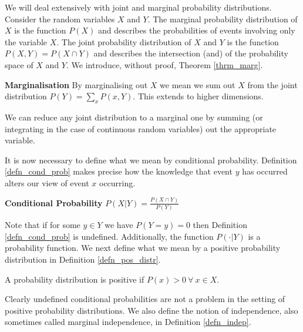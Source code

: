 \documentclass[../masters.tex]{subfiles}
\begin{document}
We will deal extensively with joint and marginal probability distributions. Consider the random variables $X$ and $Y$. The marginal probability distribution of $X$ is the function $P(X)$ and describes the probabilities of events involving only the variable $X$. The joint probability distribution of $X$ and $Y$ is the function $P(X,Y) = P(X \cap Y)$ and describes the intersection (and) of the probability space of $X$ and $Y$. We introduce, without proof, Theorem \ref{thrm_marg}.
\begin{thrm}
\textbf{Marginalisation} By marginalising out $X$ we mean we sum out $X$ from the joint distribution $P(Y) = \sum_x P(x, Y)$. This extends to higher dimensions. 
\label{thrm_marg}
\end{thrm}
We can reduce any joint distribution to a marginal one by summing (or integrating in the case of continuous random variables) out the appropriate variable. 

It is now necessary to define what we mean by conditional probability. Definition \ref{defn_cond_prob} makes precise how the knowledge that event $y$ has occurred alters our view of event $x$ occurring.  
\begin{defn}
\textbf{Conditional Probability} $P(X|Y) = \frac{P(X \cap Y)}{P(Y)}$ 
\label{defn_cond_prob}
\end{defn}
Note that if for some $y \in Y$ we have $P(Y=y) = 0$ then Definition \ref{defn_cond_prob} is undefined. Additionally, the function $P(\cdot|Y)$ is a probability function. We next define what we mean by a positive probability distribution in Definition \ref{defn_pos_distr}.
\begin{defn}
A probability distribution is positive if $P(x) > 0~\forall~x \in X$.
\label{defn_pos_distr}
\end{defn}
Clearly undefined conditional probabilities are not a problem in the setting of positive probability distributions. We also define the notion of independence, also sometimes called marginal independence, in Definition \ref{defn_indep}. 
\end{document}
